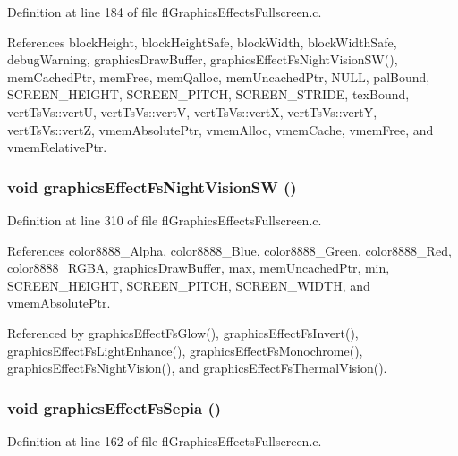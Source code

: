 Definition at line 184 of file fl\-Graphics\-Effects\-Fullscreen.c.

References block\-Height, block\-Height\-Safe, block\-Width, block\-Width\-Safe, debug\-Warning, graphics\-Draw\-Buffer, graphics\-Effect\-Fs\-Night\-Vision\-SW(), mem\-Cached\-Ptr, mem\-Free, mem\-Qalloc, mem\-Uncached\-Ptr, NULL, pal\-Bound, SCREEN\_\-HEIGHT, SCREEN\_\-PITCH, SCREEN\_\-STRIDE, tex\-Bound, vert\-Ts\-Vs::vert\-U, vert\-Ts\-Vs::vert\-V, vert\-Ts\-Vs::vert\-X, vert\-Ts\-Vs::vert\-Y, vert\-Ts\-Vs::vert\-Z, vmem\-Absolute\-Ptr, vmem\-Alloc, vmem\-Cache, vmem\-Free, and vmem\-Relative\-Ptr.
\subsubsection{\setlength{\rightskip}{0pt plus 5cm}void graphics\-Effect\-Fs\-Night\-Vision\-SW ()}\label{flGraphicsEffectsFullscreen_8c_eff760794c3e2f70e05c99cb308ebc94}




Definition at line 310 of file fl\-Graphics\-Effects\-Fullscreen.c.

References color8888\_\-Alpha, color8888\_\-Blue, color8888\_\-Green, color8888\_\-Red, color8888\_\-RGBA, graphics\-Draw\-Buffer, max, mem\-Uncached\-Ptr, min, SCREEN\_\-HEIGHT, SCREEN\_\-PITCH, SCREEN\_\-WIDTH, and vmem\-Absolute\-Ptr.

Referenced by graphics\-Effect\-Fs\-Glow(), graphics\-Effect\-Fs\-Invert(), graphics\-Effect\-Fs\-Light\-Enhance(), graphics\-Effect\-Fs\-Monochrome(), graphics\-Effect\-Fs\-Night\-Vision(), and graphics\-Effect\-Fs\-Thermal\-Vision().
\subsubsection{\setlength{\rightskip}{0pt plus 5cm}void graphics\-Effect\-Fs\-Sepia ()}\label{flGraphicsEffectsFullscreen_8c_57c69a455a44486ab5be74117bc36604}




Definition at line 162 of file fl\-Graphics\-Effects\-Fullscreen.c.

